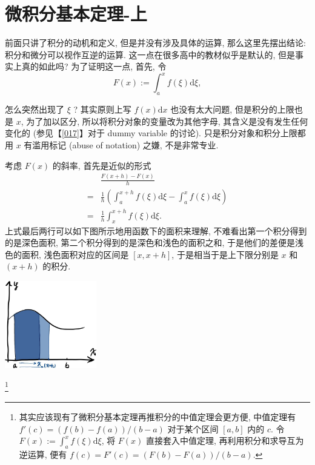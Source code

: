 \section{微积分基本定理-上}\label{018}

\begin{tcolorbox}[size=fbox, breakable, enhanced jigsaw, title={微积分基本定理 (fundamental theorem of calculus)}]

前面只讲了积分的动机和定义, 但是并没有涉及具体的运算,
那么这里先摆出结论: 积分和微分可以视作互逆的运算.
这一点在很多高中的教材似乎是默认的, 但是事实上真的如此吗?
为了证明这一点, 首先, 令 \[
F(x):=\int_a^xf(\xi)\mathrm{d}\xi,
\]

\begin{newquote}
怎么突然出现了 \(\xi\) ? 其实原则上写 \(f(x)\mathrm{d}x\)
也没有太大问题, 但是积分的上限也是 \(x\), 为了加以区分,
所以将积分对象的变量改为其他字母, 其含义是没有发生任何变化的
(参见【\ref{017}】对于 dummy variable 的讨论). 只是积分对象和积分上限都用
\(x\) 有滥用标记 (abuse of notation) 之嫌, 不是非常专业.
\end{newquote}

考虑 \(F(x)\) 的斜率, 首先是近似的形式 \[
\begin{aligned}
&\frac{F(x+h)-F(x)}{h}\\
=&\frac{1}{h}\left(\int_a^{x+h}f(\xi)\mathrm{d}\xi-\int_a^xf(\xi)\mathrm{d}\xi\right)\\
=&\frac{1}{h}\int_x^{x+h}f(\xi)\mathrm{d}\xi.
\end{aligned}
\] 上式最后两行可以如下图所示地用函数下的面积来理解,
不难看出第一个积分得到的是深色面积,
第二个积分得到的是深色和浅色的面积之和, 于是他们的差便是浅色的面积,
浅色面积对应的区间是 \([x,x+h]\), 于是相当于是上下限分别是 \(x\) 和
\((x+h)\) 的积分.

\begin{tcolorbox}[size=fbox, breakable, enhanced jigsaw]
\includegraphics[width=0.3\textwidth]{img/image-20230912145204089.png}

\end{tcolorbox}

\begin{tcolorbox}[size=fbox, breakable, enhanced jigsaw, title={插曲: 定积分的中值定理}]\footnote{其实应该现有了微积分基本定理再推积分的中值定理会更方便,
  中值定理有 \(f'(c)=(f(b)-f(a))/(b-a)\) 对于某个区间 \([a,b]\) 内的
  \(c\). 令 \(F(x):=\int_a^xf(\xi)\mathrm{d}\xi\), 将 \(F(x)\)
  直接套入中值定理, 再利用积分和求导互为逆运算, 便有
  \(f(c)=F'(c)=(F(b)-F(a))/(b-a)\).}


\end{tcolorbox}
\end{tcolorbox}
